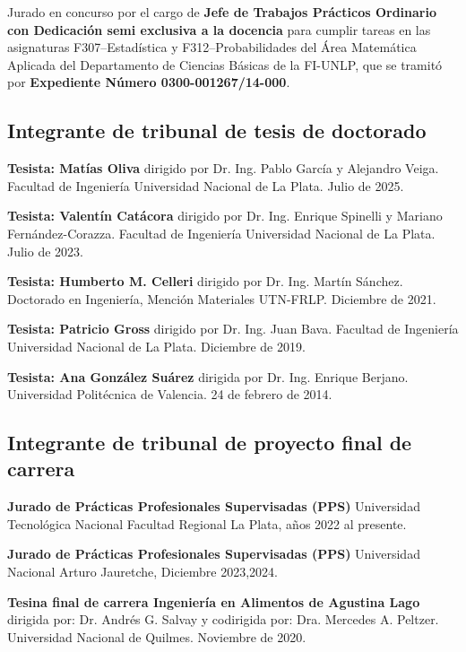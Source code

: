 \documentclass[margin,line]{res}
\begin{document}
\begin{resume}
Jurado en concurso por el cargo de {\bf Jefe de Trabajos Prácticos Ordinario con Dedicación semi exclusiva  a la docencia} para cumplir tareas en las asignaturas F307--Estadística y F312--Probabilidades del Área Matemática Aplicada del Departamento de Ciencias Básicas de la FI-UNLP, que se tramitó por {\bf Expediente Número 0300-001267/14-000}.


 \subsection{ Integrante de tribunal de tesis de doctorado}

{\bf Tesista: Matías Oliva} dirigido por Dr. Ing. Pablo García y Alejandro Veiga. Facultad de Ingeniería Universidad Nacional de La Plata. Julio de 2025.

{\bf Tesista: Valentín Catácora} dirigido por Dr. Ing. Enrique Spinelli y Mariano Fernández-Corazza. Facultad de Ingeniería Universidad Nacional de La Plata. Julio de 2023.

{\bf Tesista: Humberto M. Celleri} dirigido por Dr. Ing. Martín Sánchez. Doctorado en Ingeniería, Mención Materiales UTN-FRLP. Diciembre de 2021. 

{\bf Tesista: Patricio Gross} dirigido por Dr. Ing. Juan Bava. Facultad de Ingeniería Universidad Nacional de La Plata. Diciembre de 2019. 
 
{\bf Tesista: Ana González Suárez} dirigida por Dr. Ing. Enrique Berjano. Universidad Politécnica de Valencia. 24 de febrero de 2014.

\subsection{ Integrante de tribunal de proyecto final de carrera}

{\bf Jurado de Prácticas Profesionales Supervisadas (PPS)} Universidad Tecnológica Nacional Facultad Regional La Plata, años 2022 al presente.

{\bf Jurado de Prácticas Profesionales Supervisadas (PPS)} Universidad Nacional Arturo Jauretche, Diciembre 2023,2024.

{\bf Tesina final de carrera Ingeniería en Alimentos de Agustina Lago} dirigida por: Dr. Andrés G. Salvay y codirigida por: Dra. Mercedes A. Peltzer. Universidad Nacional de Quilmes. Noviembre de 2020.
%


\end{resume}
\end{document}
